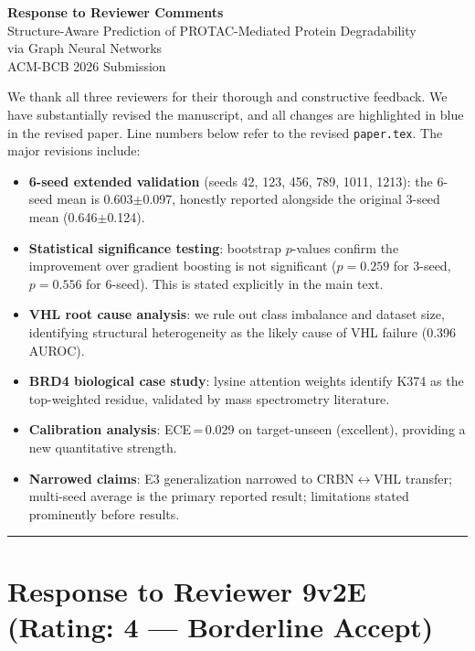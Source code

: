 \documentclass[11pt]{article}
\begin{document}
\begin{center}
{\Large\bfseries Response to Reviewer Comments}\\[6pt]
{\large Structure-Aware Prediction of PROTAC-Mediated Protein Degradability\\via Graph Neural Networks}\\[6pt]
ACM-BCB 2026 Submission
\end{center}

\bigskip

We thank all three reviewers for their thorough and constructive feedback.
We have substantially revised the manuscript, and all changes are
\textcolor{revblue}{highlighted in blue} in the revised paper.
Line numbers below refer to the revised \texttt{paper.tex}.
The major revisions include:

\begin{itemize}[topsep=2pt,itemsep=2pt]
  \item \textbf{6-seed extended validation} (seeds 42, 123, 456, 789, 1011, 1213): the 6-seed mean is 0.603$\pm$0.097, honestly reported alongside the original 3-seed mean (0.646$\pm$0.124).
  \item \textbf{Statistical significance testing}: bootstrap $p$-values confirm the improvement over gradient boosting is not significant ($p=0.259$ for 3-seed, $p=0.556$ for 6-seed). This is stated explicitly in the main text.
  \item \textbf{VHL root cause analysis}: we rule out class imbalance and dataset size, identifying structural heterogeneity as the likely cause of VHL failure (0.396 AUROC).
  \item \textbf{BRD4 biological case study}: lysine attention weights identify K374 as the top-weighted residue, validated by mass spectrometry literature.
  \item \textbf{Calibration analysis}: ECE\,=\,0.029 on target-unseen (excellent), providing a new quantitative strength.
  \item \textbf{Narrowed claims}: E3 generalization narrowed to CRBN$\leftrightarrow$VHL transfer; multi-seed average is the primary reported result; limitations stated prominently before results.
\end{itemize}

\bigskip
\hrule
\bigskip


\section*{Response to Reviewer 9v2E (Rating: 4 --- Borderline Accept)}
\end{document}
